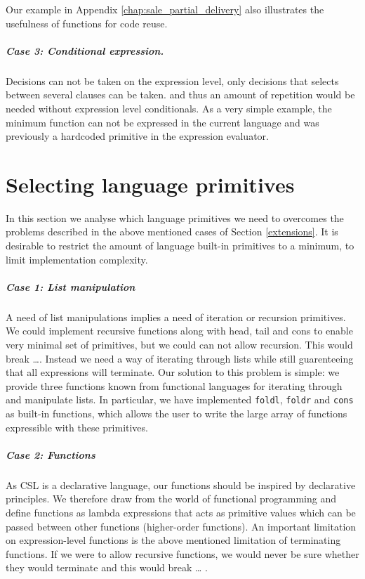 \documentclass[10pt,a4paper,final,oneside,openany,article]{memoir}
\begin{document}
Our example in Appendix \ref{chap:sale_partial_delivery} also
illustrates the usefulness of functions for code reuse.

\paragraph{Case 3: Conditional expression.} Decisions can not be taken
on the expression level, only decisions that selects between several
clauses can be taken. and thus an amount of repetition would be needed
without expression level conditionals. As a very simple example, the
minimum function can not be expressed in the current language and was
previously a hardcoded primitive in the expression evaluator.

\chapter{Selecting language primitives}
In this section we analyse which language primitives we need to
overcomes the problems described in the above mentioned cases of
Section \ref{extensions}. It is desirable to restrict the amount of
language built-in primitives to a minimum, to limit implementation
complexity. 

\paragraph{Case 1: List manipulation}
A need of list manipulations implies a need of iteration or recursion
primitives. We could implement recursive functions along with head,
tail and cons to enable very minimal set of primitives, but we could
can not allow recursion. This would break \ldots {}.
Instead we need a way of iterating through lists while still
guarenteeing that all expressions will terminate.  Our solution to
this problem is simple: we provide three functions known from
functional languages for iterating through and manipulate lists. In
particular, we have implemented \lstinline{foldl}, \lstinline{foldr}
and \lstinline{cons} as built-in functions, which allows the user to
write the large array of functions expressible with these primitives.

\paragraph{Case 2: Functions} As CSL is a declarative language, our
functions should be inspired by declarative principles. We therefore
draw from the world of functional programming and define functions as
lambda expressions that acts as primitive values which can be passed
between other functions (higher-order functions). An important
limitation on expression-level functions is the above mentioned
limitation of terminating functions. If we were to allow recursive
functions, we would never be sure whether they would terminate and
this would break \ldots %
.
\end{document}
